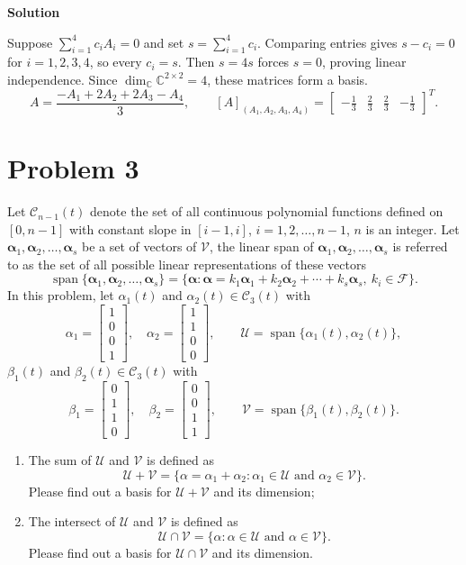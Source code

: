 \documentclass[UTF8,10pt,letterpaper,fontset=fandol]{ctexart}
\newcommand{\C}{\mathbb C}
\newcommand{\Span}{\operatorname{span}}
\newcommand{\Solution}{\par\Needspace{5\baselineskip}\textbf{Solution}\par}
\begin{document}
\Solution
Suppose \(\sum_{i=1}^4 c_iA_i=0\) and set \(s=\sum_{i=1}^4 c_i\).
Comparing entries gives \(s-c_i=0\) for \(i=1,2,3,4\), so every \(c_i=s\).
Then \(s=4s\) forces \(s=0\), proving linear independence.
Since \(\dim_{\C}\C^{2\times2}=4\), these matrices form a basis.
\[
A=\frac{-A_1+2A_2+2A_3-A_4}{3},\qquad
\boxed{[A]_{(A_1,A_2,A_3,A_4)}=
\begin{bmatrix}-\tfrac13&\tfrac23&\tfrac23&-\tfrac13\end{bmatrix}^{T}}.
\]

\section{Problem 3}
Let \(\mathcal C_{n-1}(t)\) denote the set of all continuous polynomial
functions defined on \([0,n-1]\) with constant slope in \([i-1,i]\),
\(i=1,2,\ldots,n-1\), \(n\) is an integer.
Let \(\boldsymbol\alpha_1,\boldsymbol\alpha_2,\ldots,\boldsymbol\alpha_s\)
be a set of vectors of \(\mathcal V\), the linear span of
\(\boldsymbol\alpha_1,\boldsymbol\alpha_2,\ldots,\boldsymbol\alpha_s\)
is referred to as the set of all possible linear representations of these vectors
\[
\Span\{\boldsymbol\alpha_1,\boldsymbol\alpha_2,\ldots,\boldsymbol\alpha_s\}
=\{\boldsymbol\alpha:\boldsymbol\alpha=k_1\boldsymbol\alpha_1
+k_2\boldsymbol\alpha_2+\cdots+k_s\boldsymbol\alpha_s,\ k_i\in\mathcal F\}.
\]
In this problem, let \(\alpha_1(t)\) and \(\alpha_2(t)\in\mathcal C_3(t)\) with
\[
\alpha_1=\begin{bmatrix}1\\0\\0\\1\end{bmatrix},\quad
\alpha_2=\begin{bmatrix}1\\1\\0\\0\end{bmatrix},\qquad
\mathcal U=\Span\{\alpha_1(t),\alpha_2(t)\},
\]
\(\beta_1(t)\) and \(\beta_2(t)\in\mathcal C_3(t)\) with
\[
\beta_1=\begin{bmatrix}0\\1\\1\\0\end{bmatrix},\quad
\beta_2=\begin{bmatrix}0\\0\\1\\1\end{bmatrix},\qquad
\mathcal V=\Span\{\beta_1(t),\beta_2(t)\}.
\]
\begin{enumerate}
\item The sum of \(\mathcal U\) and \(\mathcal V\) is defined as
\[
\mathcal U+\mathcal V
=\{\alpha=\alpha_1+\alpha_2:\alpha_1\in\mathcal U
\text{ and }\alpha_2\in\mathcal V\}.
\]
Please find out a basis for \(\mathcal U+\mathcal V\) and its dimension;
\item The intersect of \(\mathcal U\) and \(\mathcal V\) is defined as
\[
\mathcal U\cap\mathcal V
=\{\alpha:\alpha\in\mathcal U\text{ and }\alpha\in\mathcal V\}.
\]
Please find out a basis for \(\mathcal U\cap\mathcal V\) and its dimension.
\end{enumerate}
\end{document}
